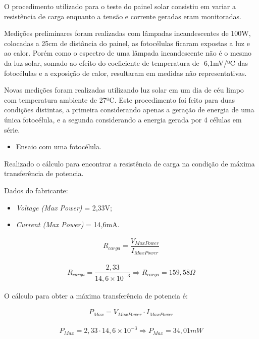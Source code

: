 \documentclass[
	12pt,				%
	openright,			%
	oneside,			%
	a4paper,			%
	english,			%
	french,				%
	spanish,			%
	brazil,				%
	oldfontcommands
	]{abntex2}
\begin{document}
	O procedimento utilizado para o teste do painel solar consistiu em variar a resistência de carga enquanto a tensão e corrente geradas eram monitoradas.
	 
	Medições preliminares foram realizadas com lâmpadas incandescentes de 100W, colocadas a 25cm de distância do painel, as fotocélulas ficaram expostas a luz e ao calor. Porém como o espectro de uma lâmpada incandescente não é o mesmo da luz solar, somado ao efeito do coeficiente de temperatura de -6,1mV/ºC das fotocélulas e a exposição de calor, resultaram em medidas não representativas.
	
	Novas medições foram realizadas utilizando luz solar em um dia de céu limpo com temperatura ambiente de 27ºC. 
Este procedimento foi feito para duas condições distintas, a primeira considerando apenas a geração de energia de uma única fotocélula, e a segunda considerando a energia gerada por 4 células em série.

	\begin{itemize}
		\item Ensaio com uma fotocélula.
	\end{itemize}
	
	Realizado o cálculo para encontrar a resistência de carga na condição de máxima transferência de potencia.
	
	Dados do fabricante:
	\begin{itemize}
		\item \textit{Voltage (Max Power)} = 2,33V;
		\item \textit{Current (Max Power)} = 14,6mA.
	\end{itemize}
	
	\begin{eqnarray}
		R_{carga} = \dfrac{V_{Max Power}}{I_{Max Power}}		
	\end{eqnarray}
	
	\begin{eqnarray*}
		R_{carga} = \dfrac{2,33}{14,6\times10^{-3}} \Rightarrow R_{carga} = 159,58\Omega		
	\end{eqnarray*}
	
	O cálculo para obter a máxima transferência de potencia é:
	
	\begin{eqnarray}
		P_{Max} = V_{Max Power} \cdot I_{Max Power}	
	\end{eqnarray}
	
	\begin{eqnarray*}
		P_{Max} = 2,33 \cdot 14,6\times10^{-3} \Rightarrow P_{Max} = 34,01mW
	\end{eqnarray*}
	
\end{document}
